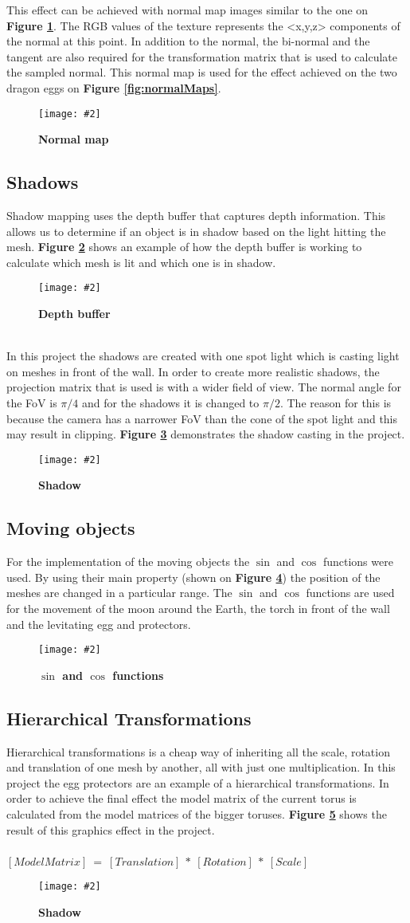 \documentclass[10pt, a4paper]{article}
\newcommand{\figuremacro}[5]{
    \begin{figure}[#1]
        \centering
        \texttt{[image: \#2]}
        \caption[#3]{\textbf{#3}#4}
        \label{fig:#2}
    \end{figure}
}
\begin{document}
   	This effect can be achieved with normal map images similar to the one on \textbf{Figure {\ref{fig:bublenormalmap}}}. The RGB values of the texture represents the <x,y,z> components of the normal at this point. In addition to the normal, the bi-normal and the tangent are also required for the transformation matrix that is used to calculate the sampled normal. This normal map is used for the effect achieved on the two dragon eggs on \textbf{Figure {\ref{fig:normalMaps}}}.
	\figuremacro{h}{bublenormalmap}{Normal map}{ }{0.8}	
	   	
	\subsection{Shadows}
	Shadow mapping uses the depth buffer that captures depth information. This allows us to determine if an object is in shadow based on the light hitting the mesh. \textbf{Figure {\ref{fig:shadowExpl}}} shows an example of how the depth buffer is working to calculate which mesh is lit and which one is in shadow. 
	\figuremacro{h}{shadowExpl}{Depth buffer}{ }{1.0}	
	\\In this project the shadows are created with one spot light which is casting light on meshes in front of the wall. In order to create more realistic shadows, the projection matrix that is used is with a wider field of view. The normal angle for the FoV is $\pi/4$ and for the shadows it is changed to $\pi/2$. The reason for this is because the camera has a narrower FoV than the cone of the spot light and this may result in clipping. \textbf{Figure {\ref{fig:shadowStick}}} demonstrates the shadow casting in the project. 
	\figuremacro{h}{shadowStick}{Shadow}{ }{0.9}

	
	\subsection{Moving objects}
	For the implementation of the moving objects the $\sin$ and $\cos$ functions were used. By using their main property (shown on \textbf{Figure {\ref{fig:sincos}}}) the position of the meshes are changed in a particular range. The $\sin$ and $\cos$ functions are used for the movement of the moon around the Earth, the torch in front of the wall and the levitating egg and protectors.	
	\figuremacro{h}{sincos}{$\sin$ and $\cos$ functions}{ }{0.9}
	\subsection{Hierarchical Transformations}
	Hierarchical transformations is a cheap way of inheriting all the scale, rotation and translation of one mesh by another, all with just one multiplication. In this project the egg protectors are an example of a hierarchical transformations. In order to achieve the final effect the model matrix of the current torus is calculated from the model matrices of the bigger toruses. \textbf{Figure {\ref{fig:hierarchicalTransformations}}} shows the result of this graphics effect in the project.
	\\\\
	$[ModelMatrix]~=~[Translation]~*~[Rotation]~*~[Scale]$~
	\figuremacro{h}{hierarchicalTransformations}{Shadow}{ }{0.8}
\end{document}

